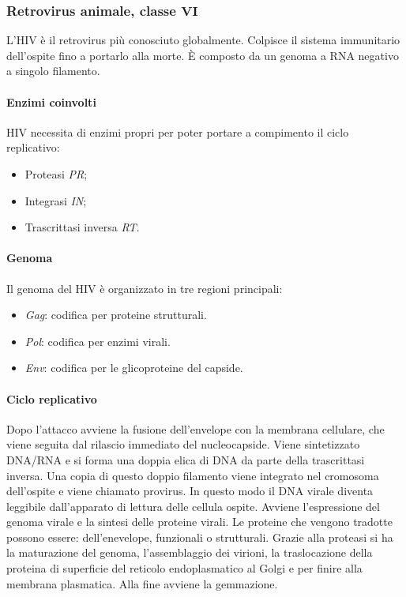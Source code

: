 			
		\subsubsection{Retrovirus animale, classe $\mathbf{VI}$}
		L'HIV \`e il retrovirus pi\`u conosciuto globalmente. 
		Colpisce il sistema immunitario dell'ospite fino a portarlo alla morte. 
		\`E composto da un genoma a RNA negativo a singolo filamento. 

			\paragraph{Enzimi coinvolti}
			HIV necessita di enzimi propri per poter portare a compimento il ciclo replicativo:
			\begin{multicols}{2}
				\begin{itemize}
					\item Proteasi \emph{PR}; 
					\item Integrasi \emph{IN}; 
					\item Trascrittasi inversa \emph{RT}.
				\end{itemize}
			\end{multicols}

			\paragraph{Genoma}
			Il genoma del HIV \`e organizzato in tre regioni principali:
			\begin{multicols}{2}
				\begin{itemize}
    					\item \emph{Gag}: codifica per proteine strutturali.
					\item \emph{Pol}: codifica per enzimi virali.
					\item \emph{Env}: codifica per le glicoproteine del capside. 
				\end{itemize}
			\end{multicols}

			\paragraph{Ciclo replicativo}
			Dopo l'attacco avviene la fusione dell'envelope con la membrana cellulare, che viene seguita dal rilascio immediato del nucleocapside. 
			Viene sintetizzato DNA/RNA e si forma una doppia elica di DNA da parte della trascrittasi inversa. 
			Una copia di questo doppio filamento viene integrato nel cromosoma dell'ospite e viene chiamato provirus. 
			In questo modo il DNA virale diventa leggibile dall'apparato di lettura delle cellula ospite. 
			Avviene l'espressione del genoma virale e la sintesi delle proteine virali. 
			Le proteine che vengono tradotte possono essere: dell'enevelope, funzionali o strutturali. 
			Grazie alla proteasi si ha la maturazione del genoma, l'assemblaggio dei virioni, la traslocazione della proteina di superficie del reticolo endoplasmatico al Golgi e per finire alla membrana plasmatica. 
			Alla fine avviene la gemmazione. 

